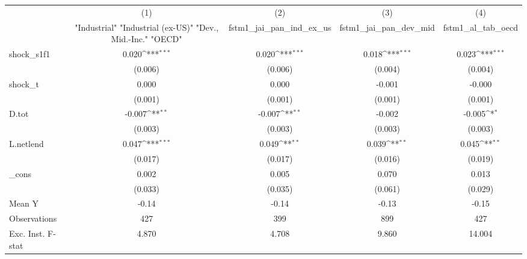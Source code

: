 {
\def\sym#1{\ifmmode^{#1}\else\(^{#1}\)\fi}
\begin{tabular}{l*{4}{c}}
\toprule
            &\multicolumn{1}{c}{(1)}&\multicolumn{1}{c}{(2)}&\multicolumn{1}{c}{(3)}&\multicolumn{1}{c}{(4)}\\
            &\multicolumn{1}{c}{ "Industrial" "Industrial (ex-US)" "Dev., Mid.-Inc." "OECD" }&\multicolumn{1}{c}{fstm1\_jai\_pan\_ind\_ex\_us}&\multicolumn{1}{c}{fstm1\_jai\_pan\_dev\_mid}&\multicolumn{1}{c}{fstm1\_al\_tab\_oecd}\\
\midrule
shock\_s1f1  &       0.020\sym{***}&       0.020\sym{***}&       0.018\sym{***}&       0.023\sym{***}\\
            &     (0.006)         &     (0.006)         &     (0.004)         &     (0.004)         \\
\addlinespace
shock\_t     &       0.000         &       0.000         &      -0.001         &      -0.000         \\
            &     (0.001)         &     (0.001)         &     (0.001)         &     (0.001)         \\
\addlinespace
D.tot       &      -0.007\sym{**} &      -0.007\sym{**} &      -0.002         &      -0.005\sym{*}  \\
            &     (0.003)         &     (0.003)         &     (0.003)         &     (0.003)         \\
\addlinespace
L.netlend   &       0.047\sym{***}&       0.049\sym{**} &       0.039\sym{**} &       0.045\sym{**} \\
            &     (0.017)         &     (0.017)         &     (0.016)         &     (0.019)         \\
\addlinespace
\_cons      &       0.002         &       0.005         &       0.070         &       0.013         \\
            &     (0.033)         &     (0.035)         &     (0.061)         &     (0.029)         \\
\midrule
Mean Y      &       -0.14         &       -0.14         &       -0.13         &       -0.15         \\
Observations&         427         &         399         &         899         &         427         \\
Exc. Inst. F-stat&       4.870         &       4.708         &       9.860         &      14.004         \\
\bottomrule
\end{tabular}
}
